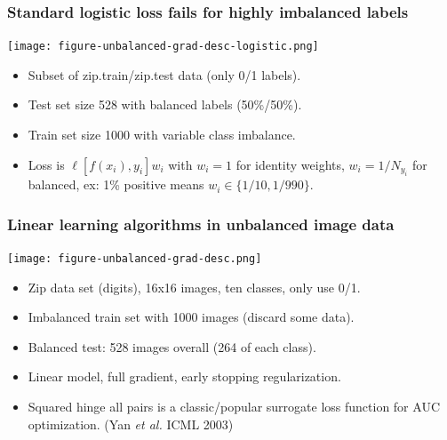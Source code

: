 \documentclass[t]{beamer}
\begin{document}

\begin{frame}
  \frametitle{Standard logistic loss fails for highly imbalanced labels}

 \texttt{[image: figure-unbalanced-grad-desc-logistic.png]}

 \begin{itemize}
 \item Subset of zip.train/zip.test data (only 0/1 labels).
 \item Test set size 528 with balanced labels (50\%/50\%).
 \item Train set size 1000 with variable class imbalance.
 \item Loss is $\ell[f(x_i), y_i]w_i$ with $w_i=1$ for identity
   weights, $w_i=1/N_{y_i}$ for balanced, ex: 1\% positive means
   $w_i\in\{1/10,1/990\}$.
 \end{itemize}

\end{frame}

\begin{frame}
  \frametitle{Linear learning algorithms in unbalanced image data}

 \texttt{[image: figure-unbalanced-grad-desc.png]}

 \begin{itemize}
 \item Zip data set (digits), 16x16 images, ten classes, only use 0/1.
 \item Imbalanced train set with 1000 images (discard some data).
 \item Balanced test: 528 images overall (264 of each class).
 \item Linear model, full gradient, early stopping regularization.
 \item Squared hinge all pairs is a classic/popular surrogate loss function
   for AUC optimization. (Yan \emph{et al.} ICML 2003)
 \end{itemize}

\end{frame}
\end{document}
